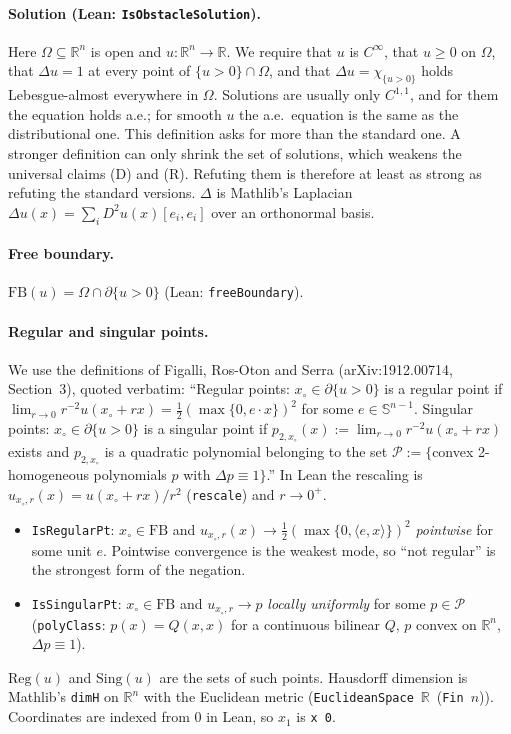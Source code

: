 \documentclass[11pt]{article}
\theoremstyle{definition}
\theoremstyle{remark}
\renewcommand{\_}{\oldus\allowbreak}
\begin{document}
\paragraph{Solution (Lean: \texttt{IsObstacleSolution}).} Here $\Omega\subseteq\mathbb R^n$ is open and
$u:\mathbb R^n\to\mathbb R$. We require that $u$ is $C^\infty$, that $u\ge 0$ on $\Omega$, that
$\Delta u=1$ at every point of $\{u>0\}\cap\Omega$, and that $\Delta u=\chi_{\{u>0\}}$ holds
Lebesgue-almost everywhere in $\Omega$. Solutions are usually only $C^{1,1}$, and for them the
equation holds a.e.; for smooth $u$ the a.e.\ equation is the same as the distributional one.
This definition asks for more than the standard one. A stronger definition can only shrink the set of solutions, which
weakens the universal claims (D) and (R). Refuting them is therefore at least as strong as refuting the
standard versions.
$\Delta$ is Mathlib's Laplacian $\Delta u(x)=\sum_i D^2u(x)[e_i,e_i]$ over an orthonormal basis.

\paragraph{Free boundary.} $\mathrm{FB}(u)=\Omega\cap\partial\{u>0\}$ (Lean: \texttt{freeBoundary}).

\paragraph{Regular and singular points.} We use the definitions of Figalli, Ros-Oton and Serra
(arXiv:1912.00714, Section~3), quoted verbatim: ``Regular points: $x_\circ\in\partial\{u>0\}$ is a
regular point if $\lim_{r\to 0}r^{-2}u(x_\circ+rx)=\frac12(\max\{0,e\cdot x\})^2$ for some
$e\in\mathbb S^{n-1}$. Singular points: $x_\circ\in\partial\{u>0\}$ is a singular point if
$p_{2,x_\circ}(x):=\lim_{r\to 0}r^{-2}u(x_\circ+rx)$ exists and $p_{2,x_\circ}$ is a quadratic
polynomial belonging to the set $\mathcal P:=\{$convex 2-homogeneous polynomials $p$ with
$\Delta p\equiv 1\}$.'' In Lean the rescaling is $u_{x_\circ,r}(x)=u(x_\circ+rx)/r^2$
(\texttt{rescale}) and $r\to0^+$.
\begin{itemize}[nosep]
\item \texttt{IsRegularPt}: $x_\circ\in\mathrm{FB}$ and $u_{x_\circ,r}(x)\to\frac12(\max\{0,\langle e,x\rangle\})^2$
  \emph{pointwise} for some unit $e$. Pointwise convergence is the weakest mode, so ``not regular'' is
  the strongest form of the negation.
\item \texttt{IsSingularPt}: $x_\circ\in\mathrm{FB}$ and $u_{x_\circ,r}\to p$ \emph{locally uniformly} for
  some $p\in\mathcal P$ (\texttt{polyClass}: $p(x)=Q(x,x)$ for a continuous bilinear $Q$, $p$
  convex on $\mathbb R^n$, $\Delta p\equiv 1$).
\end{itemize}
$\mathrm{Reg}(u)$ and $\mathrm{Sing}(u)$ are the sets of such points. Hausdorff dimension is
Mathlib's \texttt{dimH} on $\mathbb R^n$ with the Euclidean metric
(\texttt{EuclideanSpace}~$\mathbb R$~(\texttt{Fin}~$n$)). Coordinates are indexed from $0$ in Lean,
so $x_1$ is \texttt{x 0}.
\end{document}
